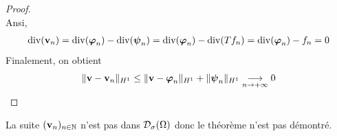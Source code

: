 \begin{appendices}
\begin{proof}
\begin{equation*}
    \end{equation*}
    Ansi, 
    \begin{eqnarray*}
        \mathrm{div}(\bm{\mathrm{v}}_n) = \mathrm{div}(\bm{\mathrm{\varphi}}_n) - \mathrm{div}(\bm{\mathrm{\psi}}_n)
        = \mathrm{div}(\bm{\mathrm{\varphi}}_n) - \mathrm{div}(Tf_n) = \mathrm{div}(\bm{\mathrm{\varphi}}_n) - f_n = 0
    \end{eqnarray*}
    Finalement, on obtient 
    \begin{equation*}
        \|\bm{\mathrm{v}}-\bm{\mathrm{v}}_n\|_{H^1} \leq \|\bm{\mathrm{v}}-\bm{\mathrm{\varphi}}_n\|_{H^1}+\|\bm{\mathrm{\psi}}_n\|_{H^1} \underset{n \to +\infty}{\longrightarrow} 0
    \end{equation*}
\end{proof}

\begin{remark}
    La suite $(\bm{\mathrm{v}}_n)_{n \in \mathbb{N}}$ n'est pas dans $\mathcal{D}_{\sigma}(\Omega)$
    donc le théorème n'est pas démontré.
\end{remark}

\newpage


\end{appendices}